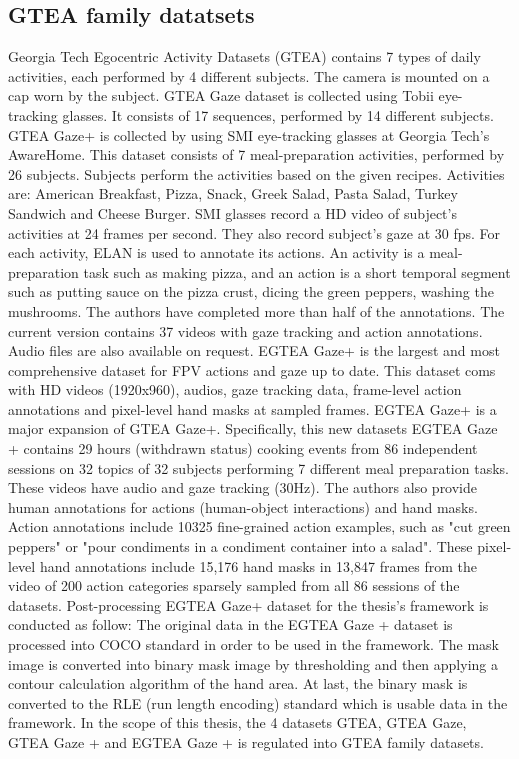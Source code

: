 \subsection{GTEA family datatsets}
Georgia Tech Egocentric Activity Datasets (GTEA) \cite{5995444} contains 7 types of daily activities, each performed by 4 different subjects. The camera is mounted on a cap worn by the subject. 
GTEA Gaze \cite{fathigaze} dataset is collected using Tobii eye-tracking glasses. It consists of 17 sequences, performed by 14 different subjects. GTEA Gaze+ \cite{7298625} is collected by using SMI eye-tracking glasses at Georgia Tech's AwareHome. This dataset consists of 7 meal-preparation activities, performed by 26 subjects. Subjects perform the activities based on the given recipes. Activities are: American Breakfast, Pizza, Snack, Greek Salad, Pasta Salad, Turkey Sandwich and Cheese Burger. SMI glasses record a HD video of subject’s activities at 24 frames per second. They also record subject's gaze at 30 fps. For each activity, ELAN is used to annotate its actions. An activity is a meal-preparation task such as making pizza, and an action is a short temporal segment such as putting sauce on the pizza crust, dicing the green peppers, washing the mushrooms. The authors have completed more than half of the annotations. The current version contains 37 videos with gaze tracking and action annotations. Audio files are also available on request.
EGTEA Gaze+ \cite{li2020eye} is the largest and most comprehensive dataset for FPV actions and gaze up to date. This dataset coms with HD videos (1920x960), audios, gaze tracking data, frame-level action annotations and pixel-level hand masks at sampled frames. EGTEA Gaze+ is a major expansion of GTEA Gaze+. Specifically, this new datasets EGTEA Gaze + contains 29 hours (withdrawn status) cooking events from 86 independent sessions on 32 topics of 32 subjects performing 7 different meal preparation tasks. These videos have audio and gaze tracking (30Hz). The authors also provide human annotations for actions (human-object interactions) and hand masks. Action annotations include 10325 fine-grained action examples, such as "cut green peppers" or "pour condiments in a condiment container into a salad". These pixel-level hand annotations include 15,176 hand masks in 13,847 frames from the video of 200 action categories sparsely sampled from all 86 sessions of the datasets. Post-processing EGTEA Gaze+ dataset for the thesis’s framework is conducted as follow: The original data in the EGTEA Gaze + dataset is processed into COCO standard in order to be used in the framework. The mask image is converted into binary mask image by thresholding and then applying a contour calculation algorithm of the hand area. At last, the binary mask is converted to the RLE (run length encoding) standard which is usable data in the framework. In the scope of this thesis, the 4 datasets GTEA, GTEA Gaze, GTEA Gaze + and EGTEA Gaze + is regulated into GTEA family datasets.
